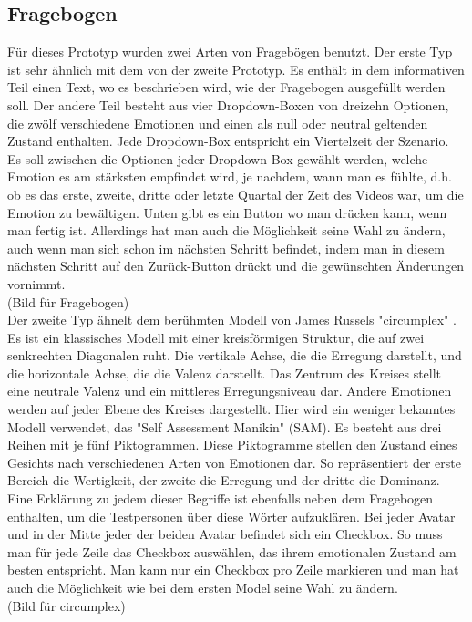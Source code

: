 \subsection{Fragebogen} \label{fragebogen-4}



Für dieses Prototyp wurden zwei Arten von Fragebögen benutzt. 
Der erste Typ ist sehr ähnlich mit dem von der zweite Prototyp. Es enthält in dem informativen Teil einen Text, wo es beschrieben wird, wie der Fragebogen ausgefüllt werden soll. Der andere Teil besteht aus vier Dropdown-Boxen von dreizehn Optionen, die zwölf verschiedene Emotionen und einen als null oder neutral geltenden Zustand enthalten. Jede Dropdown-Box entspricht ein Viertelzeit der Szenario. Es soll zwischen die Optionen jeder Dropdown-Box gewählt werden, welche Emotion es am stärksten empfindet wird, je nachdem, wann man es fühlte, d.h. ob es das erste, zweite, dritte oder letzte Quartal der Zeit des Videos war, um die Emotion zu bewältigen. Unten gibt es ein Button wo man drücken kann, wenn man fertig ist. Allerdings hat man auch die Möglichkeit seine Wahl zu ändern, auch wenn man sich schon im nächsten Schritt befindet, indem man in diesem nächsten Schritt auf den Zurück-Button drückt und die gewünschten Änderungen vornimmt. \\

(Bild für Fragebogen) \\

Der zweite Typ ähnelt dem berühmten Modell von James Russels "circumplex" \cite{russel_1980}. Es ist ein klassisches Modell mit einer kreisförmigen Struktur, die auf zwei senkrechten Diagonalen ruht. Die vertikale Achse, die die Erregung darstellt, und die horizontale Achse, die die Valenz darstellt. Das Zentrum des Kreises stellt eine neutrale Valenz und ein mittleres Erregungsniveau dar. Andere Emotionen werden auf jeder Ebene des Kreises dargestellt.  Hier wird ein weniger bekanntes Modell verwendet, das "Self Assessment Manikin" (SAM). Es besteht aus drei Reihen mit je fünf Piktogrammen. Diese Piktogramme stellen den Zustand eines Gesichts nach verschiedenen Arten von Emotionen dar. So repräsentiert der erste Bereich die Wertigkeit, der zweite die Erregung und der dritte die Dominanz. Eine Erklärung zu jedem dieser Begriffe ist ebenfalls neben dem Fragebogen enthalten, um die Testpersonen über diese Wörter aufzuklären.  Bei jeder Avatar und in der Mitte jeder der beiden Avatar befindet sich ein Checkbox.  So muss man für jede Zeile das Checkbox auswählen, das ihrem emotionalen Zustand am besten entspricht. Man kann nur ein Checkbox pro Zeile markieren und man hat auch die Möglichkeit wie bei dem ersten Model seine Wahl zu ändern. \\

(Bild für circumplex) \\